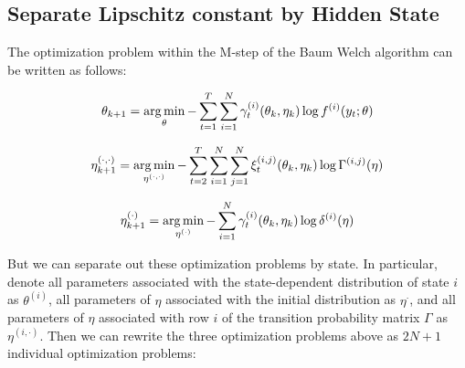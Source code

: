 



\subsection{Separate Lipschitz constant by Hidden State}
\label{subsec:diff_Ls}

The optimization problem within the M-step of the Baum Welch algorithm can be written as follows:

\begin{equation} 
    \theta_{k+1} = \operatorname*{arg\,min}_{\theta} - \sum_{t=1}^T \sum_{i=1}^N \gamma^{(i)}_t(\theta_{k}, \eta_{k}) \log f^{(i)}(y_t;\theta)
\end{equation}

\begin{equation}
    \eta^{(\cdot,\cdot)}_{k+1} = \operatorname*{arg\,min}_{\eta^{(\cdot,\cdot)}} - \sum_{t=2}^T \sum_{i=1}^N \sum_{j=1}^N \xi^{(i,j)}_t(\theta_{k}, \eta_{k}) \log \Gamma^{(i,j)}(\eta)
\end{equation}

\begin{equation}
    \eta^{(\cdot)}_{k+1} = \operatorname*{arg\,min}_{\eta^{(\cdot)}} - \sum_{i=1}^N \gamma^{(i)}_t(\theta_{k},\eta_{k}) \log \delta^{(i)}(\eta)
\end{equation}

But we can separate out these optimization problems by state. In particular, denote all parameters associated with the state-dependent distribution of state $i$ as $\theta^{(i)}$, all parameters of $\eta$ associated with the initial distribution as $\eta^{\cdot}$, and all parameters of $\eta$ associated with row $i$ of the transition probability matrix $\Gamma$ as $\eta^{(i,\cdot)}$. Then we can rewrite the three optimization problems above as $2N + 1$ individual optimization problems:

